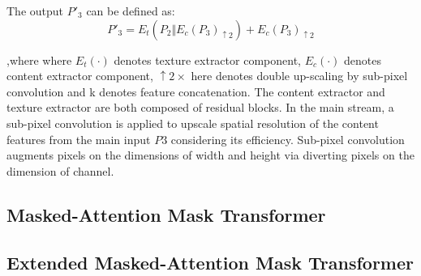 \newpage
The output $P'_3$ can be defined as:
\[P'_3 = E_t(P_2 \Vert E_c(P_3)_{\uparrow 2}) + E_c(P_3)_{\uparrow 2}\]

,where where $E_t(·)$ denotes texture extractor component, $E_c(·)$ denotes content extractor component, $\uparrow 2\times$ here denotes double up-scaling by 
sub-pixel convolution and k denotes feature concatenation. The content extractor and texture extractor are both composed of residual blocks. In the main stream, 
a sub-pixel convolution is applied to upscale spatial resolution of the content features from the main input $P3$ considering its efficiency.
Sub-pixel convolution augments pixels on the dimensions of width and height via diverting pixels on the dimension of channel.


\subsection{Masked-Attention Mask Transformer}




\subsection{Extended Masked-Attention Mask Transformer}
